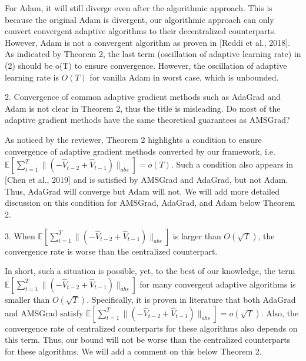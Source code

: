 \documentclass{article} %
\begin{document}
For Adam, it will still diverge even after the algorithmic approach. This is because the original Adam is divergent, our algorithmic approach can only convert convergent adaptive algorithms to their decentralized counterparts. However, Adam is not a convergent algorithm as proven in [Reddi et al., 2018].  As indicated by Theorem 2, the last term (oscillation of adaptive learning rate) in (2) should be o(T) to ensure convergence.  However, the oscillation of adaptive learning rate is $O(T)$ for vanilla Adam in worst case, which is unbounded. 
 
2. Convergence of common adaptive gradient methods such as AdaGrad and Adam is not clear in Theorem 2, thus the title is misleading. Do most of the adaptive gradient methods have the same theoretical guarantees as AMSGrad?


As noticed by the reviewer, Theorem 2 highlights a condition to ensure convergence of adaptive gradient methods converted by our framework, i.e. $ \mathbb{E}[\sum_{t=1}^T \lVert (-\hat{V}_{t-2} + \hat{V}_{t-1}) \rVert_{abs}] = o(T)$. Such a condition also appears in [Chen et al., 2019] and  is satisfied by AMSGrad and AdaGrad, but not Adam. Thus, AdaGrad will converge but Adam will not. We will add more detailed discussion on this condition for AMSGrad, AdaGrad, and Adam below Theorem 2. 


3. When $ \mathbb{E}[\sum_{t=1}^T \lVert (-\hat{V}_{t-2} + \hat{V}_{t-1}) \rVert_{abs}]$ is larger than $O(\sqrt{T})$, the convergence rate is worse than the centralized counterpart.

In short, such a situation is possible, yet, to the best of our knowledge, the term $\mathbb{E}[\sum_{t=1}^T \lVert (-\hat{V}_{t-2} + \hat{V}_{t-1}) \rVert_{abs}]$ for many convergent adaptive algorithms is smaller than $O(\sqrt{T})$. Specifically, it is proven in literature that both AdaGrad and AMSGrad satisfy $\mathbb{E}[\sum_{t=1}^T \lVert (-\hat{V}_{t-2} + \hat{V}_{t-1}) \rVert_{abs}] = o(\sqrt{T})$. Also, the convergence rate of centralized counterparts for these algorithms also depends on this term. Thus, our bound will not be worse than the centralized counterparts for these algorithms. We will add a comment on this below Theorem 2.
\end{document}

